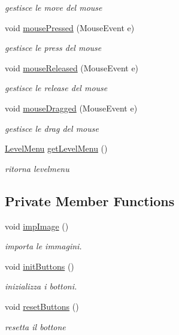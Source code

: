 \begin{DoxyCompactItemize}
\begin{DoxyCompactList}\small\item\em gestisce le move del mouse \end{DoxyCompactList}\item 
void \hyperlink{classscenes_1_1_playing_aed82e1ce3dd3cf283d508c3ba3be70ef}{mouse\+Pressed} (Mouse\+Event e)
\begin{DoxyCompactList}\small\item\em gestisce le press del mouse \end{DoxyCompactList}\item 
void \hyperlink{classscenes_1_1_playing_a87a07291794e15052db67f945d90853e}{mouse\+Released} (Mouse\+Event e)
\begin{DoxyCompactList}\small\item\em gestisce le release del mouse \end{DoxyCompactList}\item 
void \hyperlink{classscenes_1_1_playing_adbfc0588c017133c9b7070474402b72f}{mouse\+Dragged} (Mouse\+Event e)
\begin{DoxyCompactList}\small\item\em gestisce le drag del mouse \end{DoxyCompactList}\item 
\hyperlink{classui_1_1_level_menu}{Level\+Menu} \hyperlink{classscenes_1_1_playing_a0ce048e98f125d557d6b5f68d8993bb5}{get\+Level\+Menu} ()
\begin{DoxyCompactList}\small\item\em ritorna levelmenu \end{DoxyCompactList}\end{DoxyCompactItemize}
\subsection*{Private Member Functions}
\begin{DoxyCompactItemize}
\item 
void \hyperlink{classscenes_1_1_playing_aded9c531b53772fd90d09a8b6bf0132e}{imp\+Image} ()
\begin{DoxyCompactList}\small\item\em importa le immagini. \end{DoxyCompactList}\item 
void \hyperlink{classscenes_1_1_playing_a27d3ba5afb772cc36c9a432c28975ace}{init\+Buttons} ()
\begin{DoxyCompactList}\small\item\em inizializza i bottoni. \end{DoxyCompactList}\item 
void \hyperlink{classscenes_1_1_playing_a548cf4795e9d559d0c0cce0bb57a5251}{reset\+Buttons} ()
\begin{DoxyCompactList}\small\item\em resetta il bottone \end{DoxyCompactList}\end{DoxyCompactItemize}
